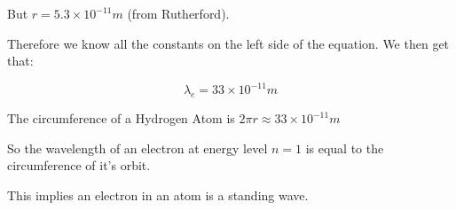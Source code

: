 \documentclass{report}
\begin{document}
\begin{description}
\begin{mdframed}
            But $r = 5.3 \times 10^{-11} \si{m}$ (from Rutherford). 

            Therefore we know all the constants on the left
            side of the equation. We then get that:

            \begin{displaymath}
                \lambda_e = 33 \times 10^{-11} \si{m}
            \end{displaymath}
            
            The circumference of a Hydrogen Atom is
            $2\pi r \approx 33 \times 10^{-11} \si{m}$
            
            So the wavelength of an electron at energy level
            $n = 1$ is equal to the circumference of it's
            orbit.

            This implies an electron in an atom is a
            standing wave.
            
        \end{mdframed}
\end{description}
\end{document}
